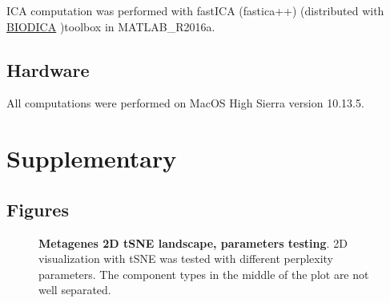 \documentclass[12pt,]{book}
\theoremstyle{definition}
\theoremstyle{definition}
\theoremstyle{definition}
\theoremstyle{remark}
\begin{document}
ICA computation was performed with fastICA (fastica++) (distributed with
\href{https://github.com/LabBandSB/BIODICA}{BIODICA} )toolbox in
MATLAB\_R2016a.

\hypertarget{hardware}{%
\subsection{Hardware}\label{hardware}}

All computations were performed on MacOS High Sierra version 10.13.5.

\clearpage

\hypertarget{supplementary}{%
\section{Supplementary}\label{supplementary}}

\hypertarget{figures}{%
\subsection{Figures}\label{figures}}

\begin{figure}[H]
\caption[Metagenes 2D tSNE landscape, parameters testing]{\textbf{Metagenes 2D tSNE landscape, parameters
testing}. 2D visualization with tSNE was tested with different
perplexity parameters. The component types in the middle of the plot are
not well separated.}\label{fig:tsne}
\end{figure}
\end{document}
